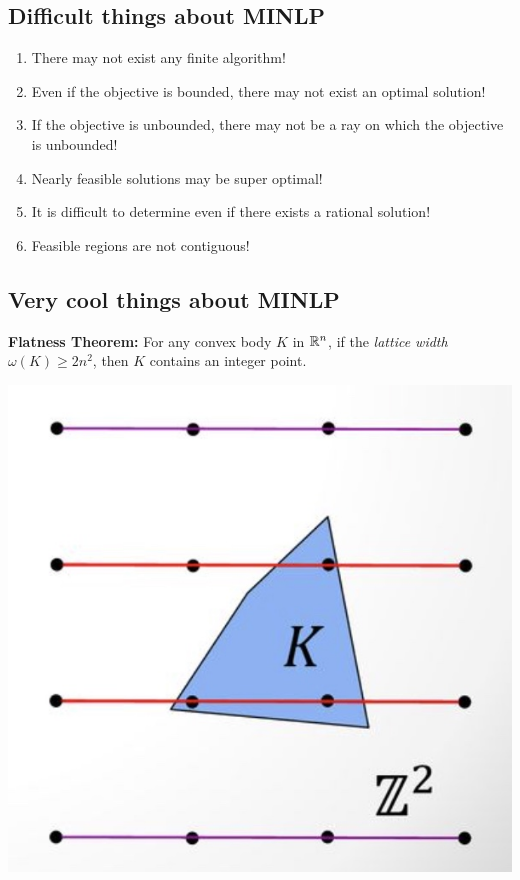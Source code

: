 \documentclass{article}
\begin{document}
\subsection{Difficult things about MINLP}

\begin{enumerate}
\item There may not exist any finite algorithm!  
\item Even if the objective is bounded, there may not exist an optimal solution!
\item If the objective is unbounded, there may not be a ray on which the objective is unbounded!
\item Nearly feasible solutions may be super optimal!
\item It is difficult to determine even if there exists a rational solution!
\item Feasible regions are not contiguous!
\end{enumerate}


\newpage

\subsection{Very cool things about MINLP}

\textbf{Flatness Theorem:}
For any convex body $K$ in $\mathbb{R}^n$, if the \emph{lattice width} $\omega(K) \geq 2n^2$, then $K$ contains an integer point.

\begin{center}
\includegraphics[scale = 0.2]{presentation_figures/flatness_theorem}
\end{center}
\end{document}
